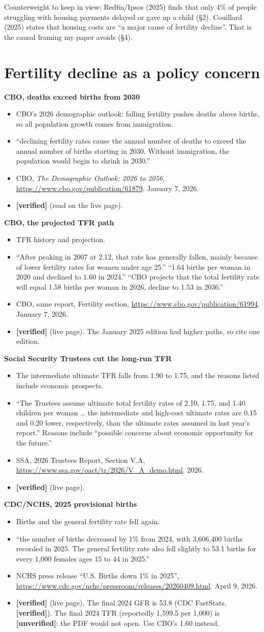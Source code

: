 \documentclass[10pt]{article}
\newcommand{\ok}{\textcolor{green!45!black}{\textbf{[verified]}}}
\newcommand{\unv}{\textcolor{red!70!black}{\textbf{[unverified]}}}
\newcommand{\entry}[5]{%
  \textbf{#1}\par
  \begin{itemize}
    \item #2
    \item #3
    \item #4
    \item #5
  \end{itemize}}
\begin{document}
Counterweight to keep in view: Redfin/Ipsos (2025) finds that only 4\% of people struggling with housing payments delayed or gave up a child (\S2). Couillard (2025) states that housing costs are ``a major cause of fertility decline''. That is the causal framing my paper avoids (\S4).

\section{Fertility decline as a policy concern}

\entry{CBO, deaths exceed births from 2030}
{CBO's 2026 demographic outlook: falling fertility pushes deaths above births, so all population growth comes from immigration.}
{``declining fertility rates cause the annual number of deaths to exceed the annual number of births starting in 2030. Without immigration, the population would begin to shrink in 2030.''}
{CBO, \emph{The Demographic Outlook: 2026 to 2056}, \url{https://www.cbo.gov/publication/61879}. January 7, 2026.}
{\ok{} (read on the live page).}

\entry{CBO, the projected TFR path}
{TFR history and projection.}
{``After peaking in 2007 at 2.12, that rate has generally fallen, mainly because of lower fertility rates for women under age 25.'' ``1.64 births per woman in 2020 and declined to 1.60 in 2024.'' ``CBO projects that the total fertility rate will equal 1.58 births per woman in 2026, decline to 1.53 in 2036.''}
{CBO, same report, Fertility section, \url{https://www.cbo.gov/publication/61994}. January 7, 2026.}
{\ok{} (live page). The January 2025 edition had higher paths, so cite one edition.}

\entry{Social Security Trustees cut the long-run TFR}
{The intermediate ultimate TFR falls from 1.90 to 1.75, and the reasons listed include economic prospects.}
{``The Trustees assume ultimate total fertility rates of 2.10, 1.75, and 1.40 children per woman \ldots{} the intermediate and high-cost ultimate rates are 0.15 and 0.20 lower, respectively, than the ultimate rates assumed in last year's report.'' Reasons include ``possible concerns about economic opportunity for the future.''}
{SSA, 2026 Trustees Report, Section V.A, \url{https://www.ssa.gov/oact/tr/2026/V_A_demo.html}. 2026.}
{\ok{} (live page).}

\entry{CDC/NCHS, 2025 provisional births}
{Births and the general fertility rate fell again.}
{``the number of births decreased by 1\% from 2024, with 3,606,400 births recorded in 2025. The general fertility rate also fell slightly to 53.1 births for every 1,000 females ages 15 to 44 in 2025.''}
{NCHS press release ``U.S. Births down 1\% in 2025'', \url{https://www.cdc.gov/nchs/pressroom/releases/20260409.html}. April 9, 2026.}
{\ok{} (live page). The final 2024 GFR is 53.8 (CDC FastStats, \ok). The final 2024 TFR (reportedly 1,599.5 per 1,000) is \unv: the PDF would not open. Use CBO's 1.60 instead.}
\end{document}
